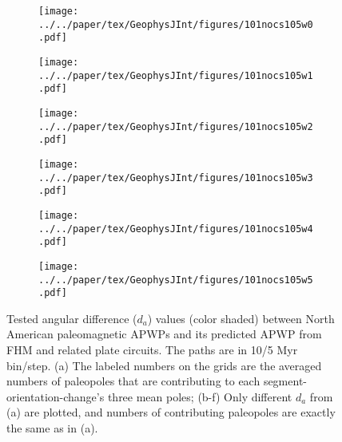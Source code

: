 \begin{figure}[!ht]
  \captionsetup[subfigure]{singlelinecheck=off,justification=raggedright,aboveskip=-6pt,belowskip=-6pt}
  \centering
  \begin{subfigure}{.495\textwidth}
    \texttt{[image: ../../paper/tex/GeophysJInt/figures/101nocs105w0.pdf]}
    \caption{}\label{fig-na-daw0}
  \end{subfigure}
  \vspace{.1em}
  \begin{subfigure}{.495\textwidth}
    \texttt{[image: ../../paper/tex/GeophysJInt/figures/101nocs105w1.pdf]}
    \caption{}\label{fig-na-daw1}
  \end{subfigure}
  \vspace{.1em}
  \begin{subfigure}{.495\textwidth}
    \texttt{[image: ../../paper/tex/GeophysJInt/figures/101nocs105w2.pdf]}
    \caption{}\label{fig-na-daw2}
  \end{subfigure}
  \vspace{.1em}
  \begin{subfigure}{.495\textwidth}
    \texttt{[image: ../../paper/tex/GeophysJInt/figures/101nocs105w3.pdf]}
    \caption{}\label{fig-na-daw3}
  \end{subfigure}
  \vspace{.1em}
  \begin{subfigure}{.495\textwidth}
    \texttt{[image: ../../paper/tex/GeophysJInt/figures/101nocs105w4.pdf]}
    \caption{}\label{fig-na-daw4}
  \end{subfigure}
  \vspace{.1em}
  \begin{subfigure}{.495\textwidth}
    \texttt{[image: ../../paper/tex/GeophysJInt/figures/101nocs105w5.pdf]}
    \caption{}\label{fig-na-daw5}
  \end{subfigure}
  \caption[$d_a$ of each pair of segment-oreintation-changes for North American
    10/5 Myr APWPs]{Tested angular difference ($d_a$) values (color shaded)
    between North American paleomagnetic APWPs and its predicted APWP from FHM
    and related plate circuits. The paths are in 10/5 Myr bin/step. (a) The
    labeled numbers on the grids are the averaged numbers of paleopoles that are
    contributing to each segment-orientation-change's three mean poles; (b-f)
    Only different $d_a$ from (a) are plotted, and numbers of contributing
    paleopoles are exactly the same as in (a).}\label{fig-nada}
\end{figure}

